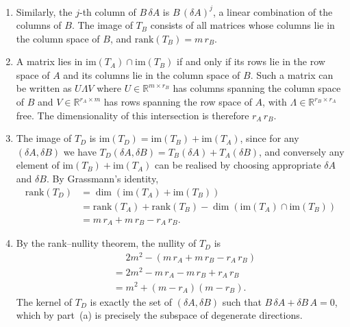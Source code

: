 \documentclass[11pt]{article}
\newcommand{\R}{\mathbb{R}}
\newcommand{\rank}{\mathrm{rank}}
\newcommand{\im}{\mathrm{im}}
\begin{document}
\begin{solution}
\begin{enumerate}
\begin{enumerate}
        \item
            Similarly, the $j$-th column of $B\,\delta\!A$ is
                $B\,(\delta\!A)^j$,
            a linear combination of the columns of $B$.
            The image of $T_B$ consists of all matrices whose columns lie in
            the column space of $B$, and
                $\rank(T_B) = m\,r_B$.

        \item
            A matrix lies in
                $\im(T_A) \cap \im(T_B)$
            if and only if its rows lie in the row space of $A$ and its
            columns lie in the column space of $B$.
            Such a matrix can be written as $U \Lambda V$ where
            $U \in \R^{m \times r_B}$ has columns spanning the column space
            of $B$ and $V \in \R^{r_A \times m}$ has rows spanning the row
            space of $A$, with $\Lambda \in \R^{r_B \times r_A}$ free.
            The dimensionality of this intersection is therefore $r_A\,r_B$.

        \item
            The image of $T_D$ is
                $\im(T_D) = \im(T_B) + \im(T_A)$,
            since for any $(\delta\!A, \delta\!B)$ we have
                $T_D(\delta\!A, \delta\!B) = T_B(\delta\!A) + T_A(\delta\!B)$,
            and conversely any element of $\im(T_B) + \im(T_A)$ can be
            realised by choosing appropriate $\delta\!A$ and $\delta\!B$.
            By Grassmann's identity,
            \begin{align*}
                \rank(T_D)
                &= \dim(\im(T_A) + \im(T_B))
            \\  &= \rank(T_A) + \rank(T_B)
                    - \dim(\im(T_A) \cap \im(T_B))
            \\  &= m\,r_A + m\,r_B - r_A\,r_B.
            \end{align*}

        \item
            By the rank--nullity theorem, the nullity of $T_D$ is
            \begin{align*}
                &\mathrel{\phantom{=}} 2m^2 - (m\,r_A + m\,r_B - r_A\,r_B)
            \\  &= 2m^2 - m\,r_A - m\,r_B + r_A\,r_B
            \\  &= m^2 + (m - r_A)(m - r_B).
            \end{align*}
            The kernel of $T_D$ is exactly the set of $(\delta\!A, \delta\!B)$
            such that $B\,\delta\!A + \delta\!B\, A = 0$, which by part~(a)
            is precisely the subspace of degenerate directions. \qedhere
    \end{enumerate}
\end{enumerate}
\end{solution}
\end{document}
